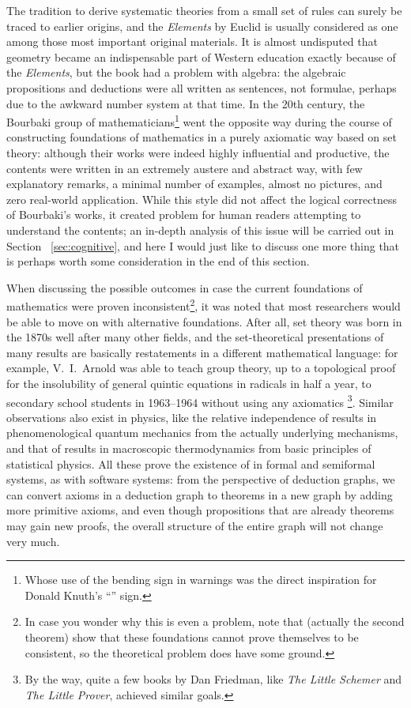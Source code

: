 The tradition to derive systematic theories from a small set of rules can surely
be traced to earlier origins, and the \emph{Elements} by Euclid is usually
considered as one among those most important original materials.  It is almost
undisputed that geometry became an indispensable part of Western education
exactly because of the \emph{Elements}, but the book had a problem with algebra:
the algebraic propositions and deductions were all written as sentences, not
formulae, perhaps due to the awkward number system at that time.  In the 20th
century, the Bourbaki group of mathematicians\footnote{Whose use of the bending
sign in warnings was the direct inspiration for Donald Knuth's ``\textdbend''
sign.} went the opposite way during the course of constructing foundations
of mathematics in a purely axiomatic way based on set theory: although their
works were indeed highly influential and productive, the contents were written
in an extremely austere and abstract way, with few explanatory remarks, a
minimal number of examples, almost no pictures, and zero real-world application.
While this style did not affect the logical correctness of Bourbaki's works,
it created problem for human readers attempting to understand the contents;
an in-depth analysis of this issue will be carried out in Section~%
\ref{sec:cognitive}, and here I would just like to discuss one more thing
that is perhaps worth some consideration in the end of this section.

When discussing the possible outcomes in case the current foundations of
mathematics were proven inconsistent\footnote{In case
you wonder why this is even a problem, note that  (actually the second theorem) show that these
foundations cannot prove themselves to be consistent, so the theoretical problem
does have some ground.}, it was noted that most researchers would be able to
move on with alternative foundations.  After all, set theory was born in the
1870s well after many other fields, and the set-theoretical presentations of
many results are basically restatements in a different mathematical language:
for example, V.~I.\ Arnold was able to teach group theory, up to a topological
proof for the insolubility of general quintic equations in radicals in half a
year, to secondary school students in 1963--1964 without using any axiomatics%
\footnote{By the way, quite a few books by
Dan Friedman, like \emph{The Little Schemer} and \emph{The Little Prover},
achieved similar goals.}.  Similar observations also exist in physics, like
the relative independence of results in phenomenological quantum mechanics
from the actually underlying mechanisms, and that of results in macroscopic
thermodynamics from basic principles of statistical physics.  All these
prove the existence of 
in formal and semiformal systems, as with software systems: from the
perspective of deduction graphs, we can convert axioms in a deduction
graph to theorems in a new graph by adding more primitive axioms, and
even though propositions that are already theorems may gain new proofs,
the overall structure of the entire graph will not change very much.

